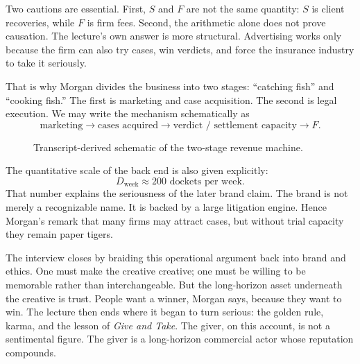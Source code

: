 Two cautions are essential. First, \(S\) and \(F\) are not the same quantity: \(S\) is client recoveries, while \(F\) is firm fees. Second, the arithmetic alone does not prove causation. The lecture's own answer is more structural. Advertising works only because the firm can also try cases, win verdicts, and force the insurance industry to take it seriously.

That is why Morgan divides the business into two stages: ``catching fish'' and ``cooking fish.'' The first is marketing and case acquisition. The second is legal execution. We may write the mechanism schematically as
\begin{equation}
\text{marketing} \to \text{cases acquired} \to \text{verdict / settlement capacity} \to F.
\end{equation}

\begin{figure}
\centering
{}
\caption{Transcript-derived schematic of the two-stage revenue machine.}
\label{fig:fish}
\end{figure}

The quantitative scale of the back end is also given explicitly:
\begin{equation}
D_{\mathrm{week}} \approx 200 \text{ dockets per week}.
\end{equation}
That number explains the seriousness of the later brand claim. The brand is not merely a recognizable name. It is backed by a large litigation engine. Hence Morgan's remark that many firms may attract cases, but without trial capacity they remain paper tigers.

The interview closes by braiding this operational argument back into brand and ethics. One must make the creative creative; one must be willing to be memorable rather than interchangeable. But the long-horizon asset underneath the creative is trust. People want a winner, Morgan says, because they want to win. The lecture then ends where it began to turn serious: the golden rule, karma, and the lesson of \emph{Give and Take}. The giver, on this account, is not a sentimental figure. The giver is a long-horizon commercial actor whose reputation compounds.

